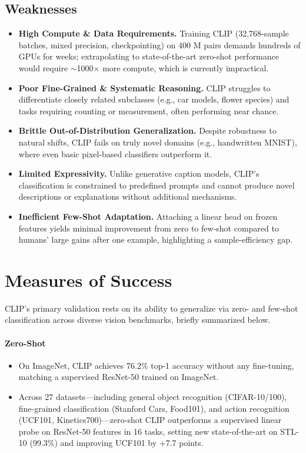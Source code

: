\documentclass[10pt]{article}
\begin{document}
\subsection*{Weaknesses}
\begin{itemize}
    \item \textbf{High Compute \& Data Requirements.} Training CLIP (32,768-sample batches, mixed precision, checkpointing) on 400 M pairs demands hundreds of GPUs for weeks; extrapolating to state-of-the-art zero-shot performance would require $\sim$1000× more compute, which is currently impractical.
    \item \textbf{Poor Fine-Grained \& Systematic Reasoning.} CLIP struggles to differentiate closely related subclasses (e.g., car models, flower species) and tasks requiring counting or measurement, often performing near chance.
    \item \textbf{Brittle Out-of-Distribution Generalization.} Despite robustness to natural shifts, CLIP fails on truly novel domains (e.g., handwritten MNIST), where even basic pixel-based classifiers outperform it.
    \item \textbf{Limited Expressivity.} Unlike generative caption models, CLIP's classification is constrained to predefined prompts and cannot produce novel descriptions or explanations without additional mechanisms.
    \item \textbf{Inefficient Few-Shot Adaptation.} Attaching a linear head on frozen features yields minimal improvement from zero to few-shot compared to humans' large gains after one example, highlighting a sample-efficiency gap.
\end{itemize}


\section*{Measures of Success}

CLIP's primary validation rests on its ability to generalize via zero- and few-shot classification across diverse vision benchmarks, briefly summarized below.

\paragraph{Zero-Shot}
\begin{itemize}
    \item On ImageNet, CLIP achieves 76.2\% top-1 accuracy without any fine-tuning, matching a supervised ResNet-50 trained on ImageNet.
    \item Across 27 datasets—including general object recognition (CIFAR-10/100), fine-grained classification (Stanford Cars, Food101), and action recognition (UCF101, Kinetics700)—zero-shot CLIP outperforms a supervised linear probe on ResNet-50 features in 16 tasks, setting new state-of-the-art on STL-10 (99.3\%) and improving UCF101 by +7.7 points.
\end{itemize}
\end{document}
